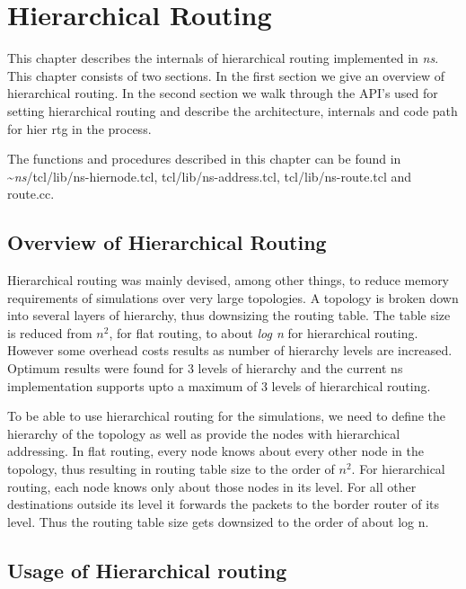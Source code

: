 \chapter{Hierarchical Routing}
\label{chap:hier-rtg}

This chapter describes the internals of hierarchical routing
implemented in \emph{ns}.
This chapter consists of two sections. In the first section we give an
overview of hierarchical routing. In the second section we walk through
the API's used for setting hierarchical routing and describe the
architecture, internals and code path for hier rtg in the process.

The functions and procedures described in this chapter can be found in
\textasciitilde\emph{ns}/{tcl/lib/ns-hiernode.tcl, tcl/lib/ns-address.tcl,
  tcl/lib/ns-route.tcl and route.cc}. 

\section{Overview of Hierarchical Routing}
\label{sec:over-hier-rtg}

Hierarchical routing was mainly devised, among other things, to reduce
memory requirements of simulations over very large topologies. A
topology is broken down into several layers of hierarchy, thus
downsizing the routing table. The table size is reduced from 
{\em {$n^{2}$}}, for flat routing, to about {\em log n} for 
hierarchical routing. However some overhead costs results as 
number of hierarchy levels are increased. Optimum results were found for
3 levels of hierarchy and the current ns implementation supports upto a
maximum of 3 levels of hierarchical routing. 

To be able to use hierarchical routing for the simulations, we need to
define the hierarchy of the topology as well as provide the nodes with
hierarchical addressing. In flat routing, every node knows about every
other node in the topology, thus resulting in routing table size to the
order of 
$n^{2}$. For hierarchical routing, each node knows only about
those nodes in its level. For all other destinations outside its level
it forwards the packets to the border router of its level. Thus the
routing table size gets downsized to the order of about log n.

\section{Usage of Hierarchical routing}
\label{sec:usage-hier-rtg} 

